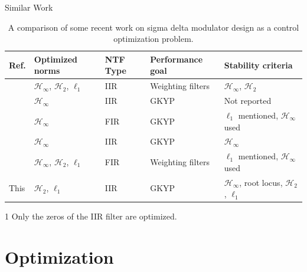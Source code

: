 \documentclass[10pt,usenames,dvipsnames]{beamer}
\begin{document}
\begin{frame}{Similar Work}

\vspace{-0.8cm}
\begin{table}
\begin{threeparttable}
	\caption{A comparison of some recent work on sigma delta modulator design as a control optimization problem.}
	\begin{tabular}{p{0.5cm} p{1.8cm} p{0.6cm} p{1.9cm} p{3.3cm}}
		\toprule
		\textbf{Ref.} & \textbf{Optimized norms} & \textbf{NTF Type} & \textbf{Performance goal} & \textbf{Stability criteria} \\
		\midrule
		\cite{Oberoi2004} & $\mathcal{H}_\infty$, $\mathcal{H}_2$, $\ell_1$ & IIR &  Weighting filters & $\mathcal{H}_\infty$, $\mathcal{H}_2$ \pause \\ 
		\cite{Osqui2007} & $\mathcal{H}_\infty$ & IIR\tnote{1} & GKYP & Not reported \pause \\
		\cite{Nagahara2012} & $\mathcal{H}_\infty$ & FIR & GKYP & $\ell_1$ mentioned, $\mathcal{H}_\infty$ used \pause \\
		\cite{Li2014} & $\mathcal{H}_\infty$ & IIR & GKYP & $\mathcal{H}_\infty$ \pause \\
		\cite{Tariq2016} & $\mathcal{H}_\infty$, $\mathcal{H}_2$, $\ell_1$ & FIR & Weighting filters & $\ell_1$ mentioned, $\mathcal{H}_\infty$ used \pause \\
		This & $\mathcal{H}_2$, $\ell_1$ & IIR & GKYP & $\mathcal{H}_\infty$, root locus, $\mathcal{H}_2$, $\ell_1$ \\
		\bottomrule
	\end{tabular}
	\begin{tablenotes}
		\item[1] Only the zeros of the IIR filter are optimized.
	\end{tablenotes}
\end{threeparttable}
\end{table}

\end{frame}

\section{Optimization}
\end{document}
